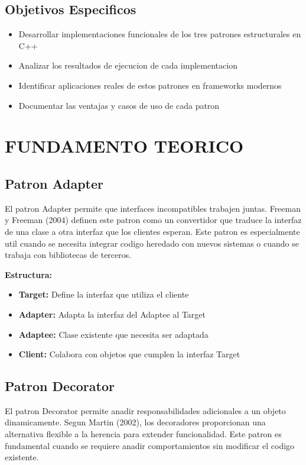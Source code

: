 \documentclass[11pt,a4paper]{article}
\begin{document}
\subsection{Objetivos Especificos}

\begin{itemize}
    \item Desarrollar implementaciones funcionales de los tres patrones estructurales en C++
    \item Analizar los resultados de ejecucion de cada implementacion
    \item Identificar aplicaciones reales de estos patrones en frameworks modernos
    \item Documentar las ventajas y casos de uso de cada patron
\end{itemize}

\section{FUNDAMENTO TEORICO}

\subsection{Patron Adapter}

El patron Adapter permite que interfaces incompatibles trabajen juntas. Freeman y Freeman (2004) definen este patron como un convertidor que traduce la interfaz de una clase a otra interfaz que los clientes esperan. Este patron es especialmente util cuando se necesita integrar codigo heredado con nuevos sistemas o cuando se trabaja con bibliotecas de terceros.

\textbf{Estructura:}
\begin{itemize}
    \item \textbf{Target:} Define la interfaz que utiliza el cliente
    \item \textbf{Adapter:} Adapta la interfaz del Adaptee al Target
    \item \textbf{Adaptee:} Clase existente que necesita ser adaptada
    \item \textbf{Client:} Colabora con objetos que cumplen la interfaz Target
\end{itemize}

\subsection{Patron Decorator}

El patron Decorator permite anadir responsabilidades adicionales a un objeto dinamicamente. Segun Martin (2002), los decoradores proporcionan una alternativa flexible a la herencia para extender funcionalidad. Este patron es fundamental cuando se requiere anadir comportamientos sin modificar el codigo existente.
\end{document}
